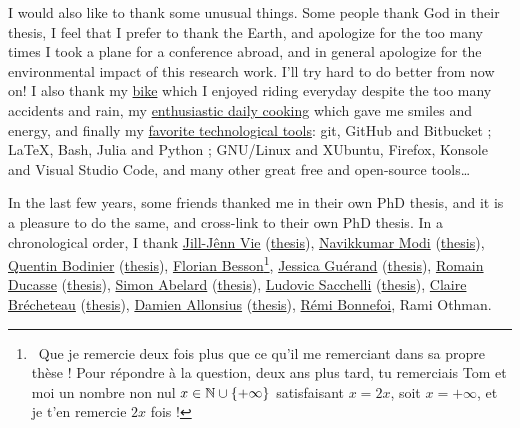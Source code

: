 \begin{acknowledgements}
I would also like to thank some unusual things. Some people thank God in their thesis, I feel that I prefer to thank the Earth, and apologize for the too many times I took a plane for a conference abroad, and in general apologize for the environmental impact of this research work. I'll try hard to do better from now on!
I also thank my \href{https://perso.crans.org/besson/zero-dechet/}{bike} which I enjoyed riding everyday despite the too many accidents and rain, my \href{https://perso.crans.org/besson/cuisine/}{enthusiastic daily cooking} which gave me smiles and energy, and finally my \href{https://perso.crans.org/besson/}{favorite technological tools}: git, GitHub and Bitbucket ; \LaTeX, Bash, Julia and Python ; GNU/Linux and XUbuntu, Firefox, Konsole and Visual Studio Code, and many other great free and open-source tools\ldots{}


In the last few years, some friends thanked me in their own PhD thesis, and it is a pleasure to do the same, and cross-link to their own PhD thesis.
In a chronological order, I thank
\href{http://jill-jenn.net/}{Jill-Jênn Vie} (\href{https://github.com/jilljenn/phd}{thesis}), \href{https://navikkumarmodi.wordpress.com/}{Navikkumar Modi} (\href{https://tel.archives-ouvertes.fr/tel-01668536/document}{thesis}), \href{https://quentinbodinier.wordpress.com/}{Quentin Bodinier} (\href{https://tel.archives-ouvertes.fr/tel-01731022/document}{thesis}), \href{https://paris-sorbonne.academia.edu/FBesson}{Florian Besson}\footnote{~Que je remercie deux fois plus que ce qu'il me remerciant dans sa propre thèse ! Pour répondre à la question, deux ans plus tard, tu remerciais Tom et moi un nombre non nul $x\in\mathbb{N}\cup\{+\infty\}$ satisfaisant $x=2x$, soit $x=+\infty$, et je t'en remercie $2x$ fois !}, \href{https://sites.google.com/view/guerand}{Jessica Guérand} (\href{https://www.theses.fr/s175725}{the}\href{https://www.theses.fr/s175725}{sis}), \href{https://sites.google.com/view/ducasse/}{Romain Ducasse} (\href{https://drive.google.com/open?id=1u2oxRRimcO0jQfuYwSVwgKfcHU5DdoPK}{thesis}), \href{https://members.loria.fr/SAbelard/}{Simon Abelard} (\href{https://members.loria.fr/SAbelard/theseabelard.pdf}{thesis}), \href{http://www.cmap.polytechnique.fr/~sacchelli/}{Ludovic Sacchelli} (\href{https://tel.archives-ouvertes.fr/tel-01893068/document}{thesis}), \href{http://pages.saclay.inria.fr/claire.brecheteau/}{Claire Brécheteau} (\href{https://hal.archives-ouvertes.fr/tel-01897787/document}{thesis}), \href{http://www.i2m.univ-amu.fr/perso/damien.allonsius/}{Damien Allonsius} (\href{http://www.i2m.univ-amu.fr/perso/damien.allonsius/documents/recherche/these/Main.pdf}{thesis}), \href{https://remibonnefoi.wordpress.com/}{Rémi Bonnefoi}, Rami Othman.



\end{acknowledgements}
